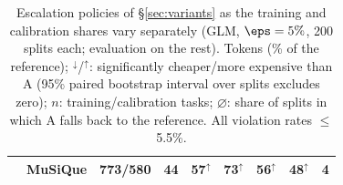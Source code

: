 \begin{table}[h]
{\begin{tabular}{@{}llrcccccr@{}}
 & MuSiQue & 773/580 & 44 & 57$^{\uparrow}$ & 73$^{\uparrow}$ & 56$^{\uparrow}$ & 48$^{\uparrow}$ & 4 \\
\bottomrule
\end{tabular}}
\caption{Escalation policies of \S\ref{sec:variants} as the training and calibration shares vary separately (GLM, $\eps = 5\%$, 200 splits each; evaluation on the rest). Tokens (\% of the reference); $^{\downarrow}$/$^{\uparrow}$: significantly cheaper/more expensive than A (95\% paired bootstrap interval over splits excludes zero); $n$: training/calibration tasks; $\varnothing$: share of splits in which A falls back to the reference. All violation rates $\le$ 5.5\%.}
\label{tab:r6}
\end{table}
